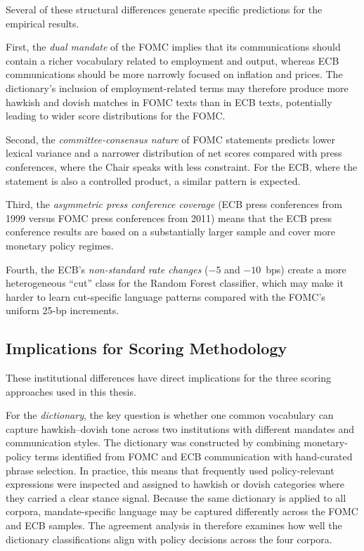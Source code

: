 Several of these structural differences generate specific
predictions for the empirical results.

First, the \emph{dual mandate} of the FOMC implies that its
communications should contain a richer vocabulary related to
employment and output, whereas ECB communications should be more
narrowly focused on inflation and prices. The dictionary's
inclusion of employment-related terms may therefore produce more
hawkish and dovish matches in FOMC texts than in ECB texts,
potentially leading to wider score distributions for the FOMC.

Second, the \emph{committee-consensus nature} of FOMC statements
predicts lower lexical variance and a narrower distribution of
net scores compared with press conferences, where the Chair speaks
with less constraint. For the ECB, where the statement is
also a controlled product, a similar pattern is expected.

Third, the \emph{asymmetric press conference coverage} (ECB press
conferences from 1999 versus FOMC press conferences from 2011)
means that the ECB press conference results are based on a
substantially larger sample and cover more monetary policy regimes.

Fourth, the ECB's \emph{non-standard rate changes} ($-5$ and
$-10$~bps) create a more heterogeneous ``cut'' class for the
Random Forest classifier, which may make it harder to learn
cut-specific language patterns compared with the FOMC's uniform
25-bp increments.


\subsection{Implications for Scoring Methodology}
\label{sec:inst_comparison_scoring}

These institutional differences have direct implications for the three
scoring approaches used in this thesis.

For the \emph{dictionary}, the key question is whether one common
vocabulary can capture hawkish--dovish tone across two institutions with
different mandates and communication styles. The dictionary was
constructed by combining monetary-policy terms identified from FOMC and
ECB communication with hand-curated phrase selection. In practice, this
means that frequently used policy-relevant expressions were inspected and
assigned to hawkish or dovish categories where they carried a clear
stance signal. Because the same dictionary is applied to all corpora,
mandate-specific language may be captured differently across the FOMC
and ECB samples. The agreement analysis in  
therefore examines how well the dictionary classifications align with
policy decisions across the four corpora.

